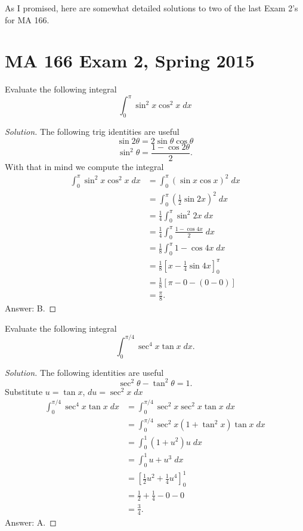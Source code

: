 As I promised, here are somewhat detailed solutions to two of the last Exam
2's for MA 166.
\chapter{MA 166 Exam 2, Spring 2015}
\begin{problem}
Evaluate the following integral
\[
\int_0^\pi \sin^2x \cos^2 x\;dx
\]
\end{problem}
\begin{proof}[Solution]
The following trig identities are useful
\begin{equation}
  \label{eq:sine-double-angle-formula}
\sin 2\theta=2\sin\theta\cos\theta
\end{equation}
\begin{equation}
\label{eq:sine-square-formula}
\sin^2\theta=\frac{1-\cos 2\theta}{2}.
\end{equation}
With that in mind we compute the integral
\begin{align*}
\int_0^\pi \sin^2x \cos^2 x\;dx
&=\int_0^\pi\left(\sin x\cos x\right)^2\;dx\\
&=\int_0^\pi\left(\frac{1}{2}\sin 2x\right)^2\;dx\\
&=\frac{1}{4}\int_0^\pi\sin^2 2x\;dx\\
&=\frac{1}{4}\int_0^\pi\frac{1-\cos 4x}{2}\;dx\\
&=\frac{1}{8}\int_0^\pi 1-\cos 4x\;dx\\
&=\frac{1}{8}\left[x-\frac{1}{4}\sin 4x\right]_0^\pi\\
&=\frac{1}{8}\left[\pi-0-(0-0)\right]\\
&=\boxed{\frac{\pi}{8}.}
\end{align*}
Answer: B.
\end{proof}
\begin{problem}
Evaluate the following integral
\[
\int_0^{\pi/4}\sec^4 x\tan x\;dx.
\]
\end{problem}
\begin{proof}[Solution]
The following identities are useful
\begin{equation}
  \label{eq:tangent-pythagorean-identity}
\sec^2\theta-\tan^2\theta=1.
\end{equation}
Substitute $u=\tan x$, $du=\sec^2 x\;dx$
\begin{align*}
\int_0^{\pi/4}\sec^4 x\tan x\;dx
&=\int_0^{\pi/4}\sec^2 x\sec^2 x\tan x\;dx\\
&=\int_0^{\pi/4}\sec^2 x(1+\tan^2 x)\tan x\;dx\\
&=\int_0^1(1+u^2)u\;dx\\
&=\int_0^1u+u^3\;dx\\
&=\left[\frac{1}{2}u^2+\frac{1}{4}u^4\right]_0^1\\
&=\frac{1}{2}+\frac{1}{4}-0-0\\
&=\boxed{\frac{3}{4}.}
\end{align*}
Answer: A.
\end{proof}
